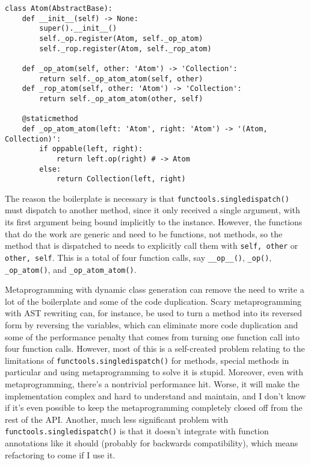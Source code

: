 \documentclass[12pt]{article}
\begin{document}
\begin{lstlisting}
class Atom(AbstractBase):
    def __init__(self) -> None:
        super().__init__()
        self._op.register(Atom, self._op_atom)
        self._rop.register(Atom, self._rop_atom)

    def _op_atom(self, other: 'Atom') -> 'Collection':
        return self._op_atom_atom(self, other)
    def _rop_atom(self, other: 'Atom') -> 'Collection':
        return self._op_atom_atom(other, self)

    @staticmethod
    def _op_atom_atom(left: 'Atom', right: 'Atom') -> '(Atom, Collection)':
        if oppable(left, right):
            return left.op(right) # -> Atom
        else:
            return Collection(left, right)
\end{lstlisting}

The reason the boilerplate is necessary is that
\texttt{functools.singledispatch()} must dispatch to another method,
since it only received a single argument, with its first argument
being bound implicitly to the instance.  However, the functions that
do the work are generic and need to be functions, not methods, so the
method that is dispatched to needs to explicitly call them with
\texttt{self, other} or \texttt{other, self}.  This is a total of four
function calls, say \texttt{\_\_op\_\_()}, \texttt{\_op()},
\texttt{\_op\_atom()}, and \texttt{\_op\_atom\_atom()}.

Metaprogramming with dynamic class generation can remove the need to
write a lot of the boilerplate and some of the code duplication.
Scary metaprogramming with AST rewriting can, for instance, be used to
turn a method into its reversed form by reversing the variables, which
can eliminate more code duplication and some of the performance
penalty that comes from turning one function call into four function
calls.  However, most of this is a self-created problem relating to
the limitations of \texttt{functools.singledispatch()} for methods,
special methods in particular and using metaprogramming to solve it is
stupid.  Moreover, even with metaprogramming, there's a nontrivial
performance hit.  Worse, it will make the implementation complex and
hard to understand and maintain, and I don't know if it's even
possible to keep the metaprogramming completely closed off from the
rest of the API.  Another, much less significant problem with
\texttt{functools.singledispatch()} is that it doesn't integrate with
function annotations like it should (probably for backwards
compatibility), which means refactoring to come if I use it.
\end{document}
